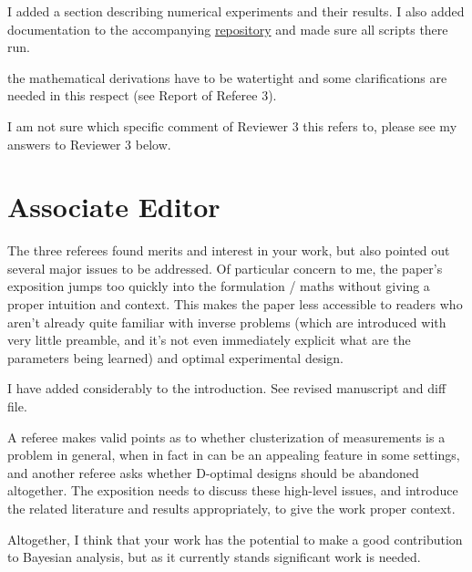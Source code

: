 \documentclass{article}
\begin{document}
\AR I added a section describing numerical experiments and their
results. I also added documentation to the accompanying
\href{https://github.com/yairdaon/OED}{repository} and made sure all
scripts there run.
    
\RC the mathematical derivations have to be watertight and some
clarifications are needed in this respect (see Report of Referee 3).
  
\AR I am not sure which specific comment of Reviewer 3 this refers to,
please see my answers to Reviewer 3 below.
   

\section{Associate Editor}\label{ae}
\RC The three referees found merits and interest in your work, but also
pointed out several major issues to be addressed. Of particular
concern to me, the paper's exposition jumps too quickly into the
formulation / maths without giving a proper intuition and
context. This makes the paper less accessible to readers who aren't
already quite familiar with inverse problems (which are introduced
with very little preamble, and it's not even immediately explicit what
are the parameters being learned) and optimal experimental design.

\AR I have added considerably to the introduction. See revised
manuscript and diff file.


\RC A referee makes valid points as to whether clusterization of
measurements is a problem in general, when in fact in can be an
appealing feature in some settings, and another referee asks whether
D-optimal designs should be abandoned altogether. The exposition
needs to discuss these high-level issues, and introduce the related
literature and results appropriately, to give the work proper
context.



\RC Altogether, I think that your work has the potential to make a
good contribution to Bayesian analysis, but as it currently stands
significant work is needed.











\end{document}
